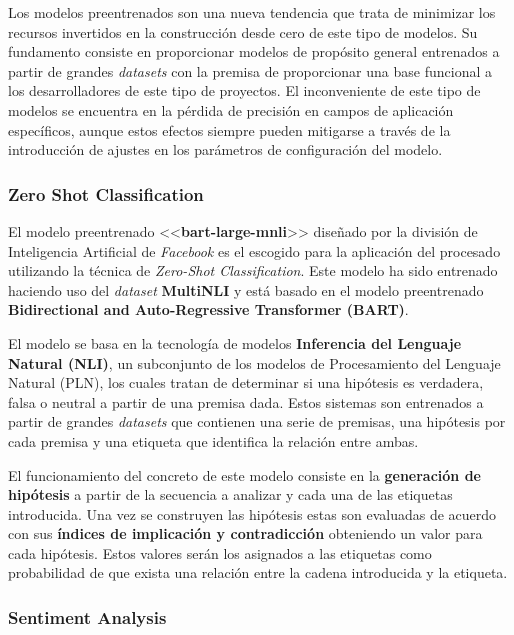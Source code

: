 Los modelos preentrenados \cite{ct:pretrained_models} son una nueva tendencia que trata de minimizar los recursos invertidos en la construcción desde cero de este tipo de modelos. Su fundamento consiste en proporcionar modelos de propósito general entrenados a partir de grandes \emph{datasets} con la premisa de proporcionar una base funcional a los desarrolladores de este tipo de proyectos. El inconveniente de este tipo de modelos se encuentra en la pérdida de precisión en campos de aplicación específicos, aunque estos efectos siempre pueden mitigarse a través de la introducción de ajustes en los parámetros de configuración del modelo.

\subsubsection{Zero Shot Classification} \label{sec:clasificadorzeroshot}

El modelo preentrenado <<\textbf{bart-large-mnli}>> \cite{huggingface:bart_large_mnli} diseñado por la división de Inteligencia Artificial de \emph{Facebook} es el escogido para la aplicación del procesado utilizando la técnica de \emph{Zero-Shot Classification}. Este modelo ha sido entrenado haciendo uso del \emph{dataset} \textbf{MultiNLI} y está basado en el modelo preentrenado \textbf{Bidirectional and Auto-Regressive Transformer (BART)}.

El modelo se basa en la tecnología de modelos \textbf{Inferencia del Lenguaje Natural (NLI)}, un subconjunto de los modelos de Procesamiento del Lenguaje Natural (PLN), los cuales tratan de determinar si una hipótesis es verdadera, falsa o neutral a partir de una premisa dada. Estos sistemas son entrenados a partir de grandes \emph{datasets} que contienen una serie de premisas, una hipótesis por cada premisa y una etiqueta que identifica la relación entre ambas.

El funcionamiento del concreto de este modelo consiste en la \textbf{generación de hipótesis} a partir de la secuencia a analizar y cada una de las etiquetas introducida. Una vez se construyen las hipótesis estas son evaluadas de acuerdo con sus \textbf{índices de implicación y contradicción} obteniendo un valor para cada hipótesis. Estos valores serán los asignados a las etiquetas como probabilidad de que exista una relación entre la cadena introducida y la etiqueta.

\subsubsection{Sentiment Analysis} \label{sec:analisissentimientos}

